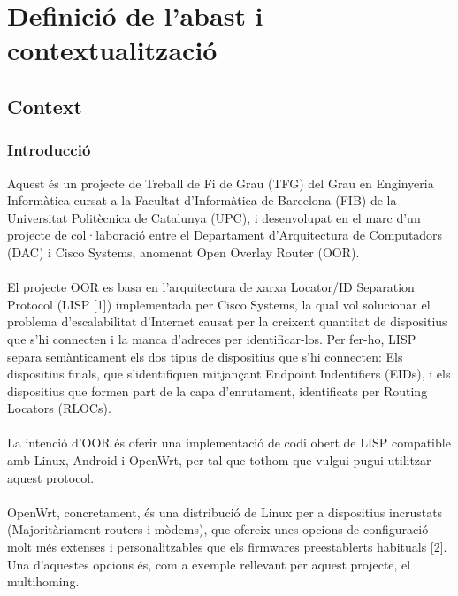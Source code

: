 \documentclass[11pt]{article}
\begin{document}
\newpage
\renewcommand{\thepage}{\roman{page}}
\setcounter{page}{1}
\tableofcontents

\newpage
\renewcommand{\thepage}{\arabic{page}}
\setcounter{page}{1}					%
\section{Definició de l'abast i contextualització}
\subsection{Context}
\subsubsection{Introducció}
Aquest és un projecte de Treball de Fi de Grau (TFG) del Grau en Enginyeria Informàtica cursat a la Facultat d’Informàtica de Barcelona (FIB) de la Universitat Politècnica de Catalunya (UPC), i desenvolupat en el marc d’un projecte de col·laboració entre el Departament d’Arquitectura de Computadors (DAC) i Cisco Systems, anomenat Open Overlay Router (OOR).\\
\\
El projecte OOR es basa en l’arquitectura de xarxa Locator/ID Separation Protocol (LISP [1]) implementada per Cisco Systems, la qual vol solucionar el problema d’escalabilitat d’Internet causat per la creixent quantitat de dispositius que s’hi connecten i la manca d’adreces per identificar-los. Per fer-ho, LISP separa semànticament els dos tipus de dispositius que s’hi connecten: Els dispositius finals, que s’identifiquen mitjançant Endpoint Indentifiers (EIDs), i els dispositius que formen part de la capa d’enrutament, identificats per Routing Locators (RLOCs).\\
\\
La intenció d’OOR és oferir una implementació de codi obert de LISP compatible amb Linux, Android i OpenWrt, per tal que tothom que vulgui pugui utilitzar aquest protocol.\\
\\
OpenWrt, concretament, és una distribució de Linux per a dispositius incrustats (Majoritàriament routers i mòdems), que ofereix unes opcions de configuració molt més extenses i personalitzables que els firmwares preestablerts habituals [2]. Una d’aquestes opcions és, com a exemple rellevant per aquest projecte, el multihoming.\\
\\
\end{document}
